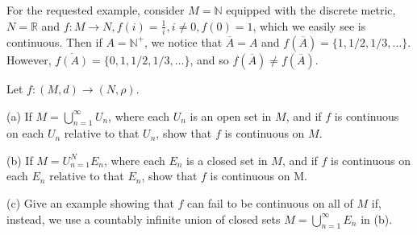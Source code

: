 \begin{solution}
    For the requested example, consider $M = \mathbb{N}$ equipped with the discrete metric, $N = \mathbb{R}$ and $f: M \rightarrow N, f(i) = \frac{1}{i}, i \neq 0, f(0) = 1$, which we easily see is continuous.
    Then if $A = \mathbb{N}^+$, we notice that $\overline{A} = A$ and $f(\overline{A}) = \{1, 1/2, 1/3, \ldots\}$.
    However, $\overline{f(A)} = \{0, 1, 1/2, 1/3, \ldots\}$, and so $f(\overline{A}) \neq f(\overline{A})$.

\end{solution}

\begin{exercise}{31}
    Let $f: (M, d) \rightarrow (N, \rho)$.

    (a) If $M = \bigcup_{n = 1}^{\infty} U_n$, where each $U_n$ is an open set in $M$, and if $f$ is continuous on each $U_n$ relative to that $U_n$, show that $f$ is continuous on $M$.

    (b) If $M = U_{n=1}^{N} E_n$, where each $E_n$ is a closed set in $M$, and if $f$ is continuous on each $E_n$ relative to that $E_n$, show that $f$ is continuous on M.

    (c) Give an example showing that $f$ can fail to be continuous on all of $M$ if, instead, we use a countably infinite union of closed sets $M = \bigcup_{n=1}^{\infty} E_n$ in (b).
\end{exercise}

